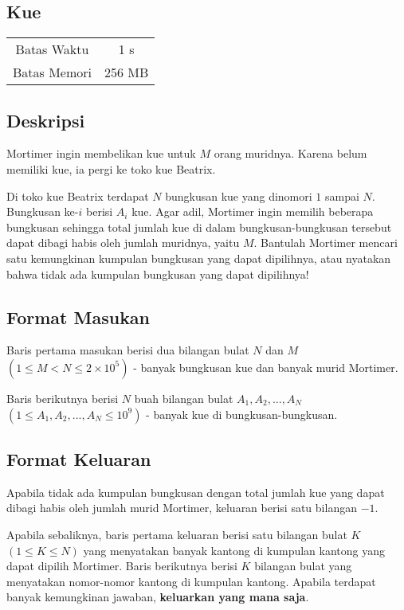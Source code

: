 \documentclass{article}
\begin{document}
\begin{center}
    \section*{Kue} %

    \begin{tabular}{ | c c | }
        \hline
        Batas Waktu  & 1 s \\    %
        Batas Memori & 256 MB \\  %
        \hline
    \end{tabular}
\end{center}

\subsection*{Deskripsi}
Mortimer ingin membelikan kue untuk $M$ orang muridnya. Karena belum memiliki kue, ia pergi ke toko kue Beatrix.

Di toko kue Beatrix terdapat $N$ bungkusan kue yang dinomori $1$ sampai $N$. Bungkusan ke-$i$ berisi $A_i$ kue. Agar adil, Mortimer ingin memilih beberapa bungkusan sehingga total jumlah kue di dalam bungkusan-bungkusan tersebut dapat dibagi habis oleh jumlah muridnya, yaitu $M$. Bantulah Mortimer mencari satu kemungkinan kumpulan bungkusan yang dapat dipilihnya, atau nyatakan bahwa tidak ada kumpulan bungkusan yang dapat dipilihnya!

\subsection*{Format Masukan}
Baris pertama masukan berisi dua bilangan bulat $N$ dan $M$ $(1 \leq M < N \leq 2\times10^5)$ - banyak bungkusan kue dan banyak murid Mortimer. 

Baris berikutnya berisi $N$ buah bilangan bulat $A_1, A_2, ..., A_N$ $(1 \leq A_1, A_2, ..., A_N \leq 10^9)$ - banyak kue di bungkusan-bungkusan.

\subsection*{Format Keluaran}
Apabila tidak ada kumpulan bungkusan dengan total jumlah kue yang dapat dibagi habis oleh jumlah murid Mortimer, keluaran berisi satu bilangan $-1$.

Apabila sebaliknya, baris pertama keluaran berisi satu bilangan bulat $K$ $(1 \leq K \leq N)$ yang menyatakan banyak kantong di kumpulan kantong yang dapat dipilih Mortimer. Baris berikutnya berisi $K$ bilangan bulat yang menyatakan nomor-nomor kantong di kumpulan kantong. Apabila terdapat banyak kemungkinan jawaban, \textbf{keluarkan yang mana saja}.
\end{document}
